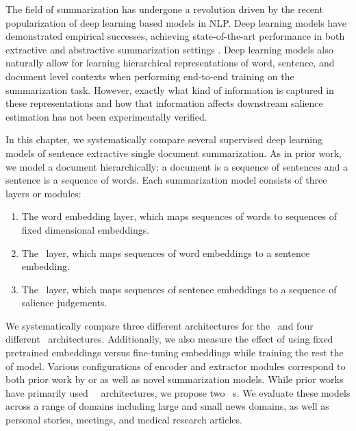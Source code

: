 The field of summarization has undergone a revolution driven by the recent
popularization of deep learning based models in NLP.  Deep learning models have
demonstrated empirical successes, achieving state-of-the-art performance in
both extractive \citep{cheng2016neural,nallapati2017summarunner} and
abstractive summarization settings \citep{nallapati2016,see2017,zhang2019}.
Deep learning models also naturally allow for learning hierarchical
representations of word, sentence, and document level contexts when performing
end-to-end training on the summarization task.  However, exactly what kind of
information is captured in these representations and how that information
affects downstream salience estimation has not been experimentally verified. 

In this chapter, we systematically compare several supervised deep learning
models of sentence extractive single document summarization.  As in prior work,
we model a document hierarchically: a document is a sequence of sentences and a
sentence is a sequence of words.  Each summarization model consists of three
layers or modules: 
\begin{enumerate}
\item The word embedding layer, which maps sequences of words to sequences of
    fixed dimensional embeddings. 
\item The \sentenceencoder~layer, which maps sequences of word embeddings to a
    sentence embedding. 
\item The \sentenceextractor~layer, which maps sequences of sentence
    embeddings to a sequence of salience judgements.
\end{enumerate}

We systematically compare three different architectures for the
\sentenceencoder~and four different \sentenceextractor~architectures.
Additionally, we also measure the effect of using fixed pretrained embeddings
versus fine-tuning embeddings while training the rest the of model.  Various
configurations of encoder and extractor modules correspond to both prior work
by \cite{cheng2016neural} or \cite{nallapati2017summarunner} as well as novel
summarization models. While prior works have primarily used
\autoregressive~\sentenceextractor~architectures, we propose two
\nonautoregressive~\sentenceextractor s.  We evaluate these models across a
range of domains including large and small news domains, as well as personal
stories, meetings, and medical research articles. 

